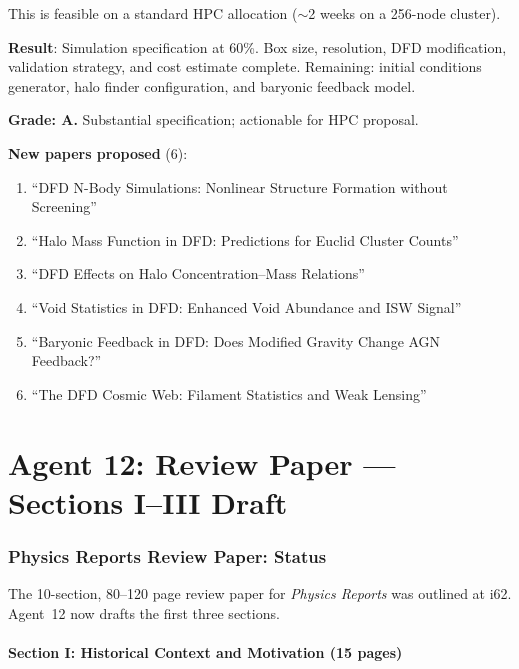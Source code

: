 \documentclass[11pt,a4paper]{article}
\begin{document}
This is feasible on a standard HPC allocation ($\sim$2 weeks on a 256-node cluster).

\begin{tcolorbox}[colback=blue!5!white, colframe=blue!60!black, title={Agent 11: N-Body Spec at 60\%}]
\textbf{Result}: Simulation specification at 60\%. Box size, resolution, DFD modification, validation strategy, and cost estimate complete. Remaining: initial conditions generator, halo finder configuration, and baryonic feedback model.

\textbf{Grade: A.} Substantial specification; actionable for HPC proposal.

\textbf{New papers proposed} (6):
\begin{enumerate}
\item ``DFD N-Body Simulations: Nonlinear Structure Formation without Screening''
\item ``Halo Mass Function in DFD: Predictions for Euclid Cluster Counts''
\item ``DFD Effects on Halo Concentration--Mass Relations''
\item ``Void Statistics in DFD: Enhanced Void Abundance and ISW Signal''
\item ``Baryonic Feedback in DFD: Does Modified Gravity Change AGN Feedback?''
\item ``The DFD Cosmic Web: Filament Statistics and Weak Lensing''
\end{enumerate}
\end{tcolorbox}


\part{Agent 12: Review Paper --- Sections I--III Draft}
\label{part:review}

\section{Physics Reports Review Paper: Status}

The 10-section, 80--120 page review paper for \textit{Physics Reports} was outlined at i62. Agent~12 now drafts the first three sections.

\subsection{Section I: Historical Context and Motivation (15 pages)}
\end{document}
